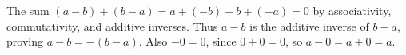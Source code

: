 The sum $(a-b)+(b-a)=a+(-b)+b+(-a)=0$ by associativity, commutativity, and additive inverses. Thus $a-b$ is the additive inverse of $b-a$, proving $a-b=-(b-a)$. Also $-0=0$, since $0+0=0$, so $a-0=a+0=a$.
